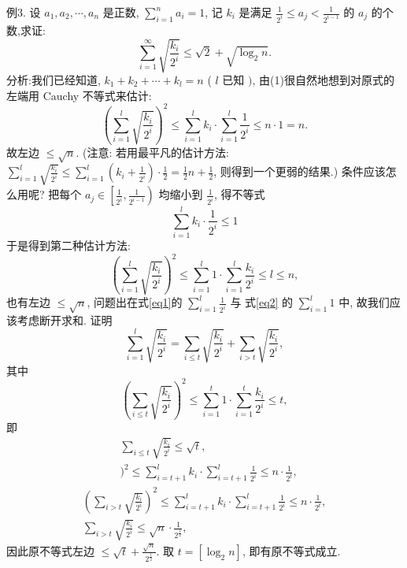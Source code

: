 例3. 设 $a_1, a_2, \cdots, a_n$ 是正数, $\sum_{i=1}^n a_i=1$, 记 $k_i$ 是满足 $\frac{1}{2^i} \leqslant a_j<\frac{1}{2^{i-1}}$ 的 $a_j$ 的个数,求证:
$$
\sum_{i=1}^{\infty} \sqrt{\frac{k_i}{2^i}} \leqslant \sqrt{2}+\sqrt{\log _2 n} .
$$
分析:我们已经知道, $k_1+k_2+\cdots+k_l=n$ ( $l$ 已知 $)$,
由(1)很自然地想到对原式的左端用 Cauchy 不等式来估计:
$$
\left(\sum_{i=1}^l \sqrt{\frac{k_i}{2^i}}\right)^2 \leqslant \sum_{i=1}^l k_i \cdot \sum_{i=1}^l \frac{1}{2^i} \leqslant n \cdot 1=n . \label{eq1}
$$
故左边 $\leqslant \sqrt{n}$.
(注意: 若用最平凡的估计方法: $\sum_{i=1}^l \sqrt{\frac{k_i}{2^i}} \leqslant \sum_{i=1}^l\left(k_i+\frac{1}{2^i}\right) \cdot \frac{1}{2}=\frac{1}{2} n+ \frac{1}{2}$, 则得到一个更弱的结果.)
条件应该怎么用呢?
把每个 $a_j \in\left[\frac{1}{2^i}, \frac{1}{2^{i-1}}\right)$ 均缩小到 $\frac{1}{2^i}$, 得不等式
$$
\sum_{i=1}^l k_i \cdot \frac{1}{2^i} \leqslant 1
$$
于是得到第二种估计方法:
$$
\left(\sum_{i=1}^l \sqrt{\frac{k_i}{2^i}}\right)^2 \leqslant \sum_{i=1}^l 1 \cdot \sum_{i=1}^l \frac{k_i}{2^i} \leqslant l \leqslant n, \label{eq2}
$$
也有左边 $\leqslant \sqrt{n}$, 问题出在式\ref{eq1}的 $\sum_{i=1}^l \frac{1}{2^i}$ 与 式\ref{eq2} 的 $\sum_{i=1}^l 1$ 中, 故我们应该考虑断开求和.
证明
$$
\sum_{i=1}^l \sqrt{\frac{k_i}{2^i}}=\sum_{i \leqslant t} \sqrt{\frac{k_i}{2^i}}+\sum_{i>t} \sqrt{\frac{k_i}{2^i}},
$$
其中
$$
\left(\sum_{i \leqslant t} \sqrt{\frac{k_i}{2^i}}\right)^2 \leqslant \sum_{i=1}^t 1 \cdot \sum_{i=1}^t \frac{k_i}{2^i} \leqslant t,
$$
即
$$
\begin{aligned}
& \sum_{i \leqslant t} \sqrt{\frac{k_i}{2^i}} \leqslant \sqrt{t}, \\
& )^2 \leqslant \sum_{i=t+1}^l k_i \cdot \sum_{i=t+1}^l \frac{1}{2^i} \leqslant n \cdot \frac{1}{2^t},
\end{aligned}
$$
$$
\begin{gathered}
\left(\sum_{i>t} \sqrt{\frac{k_i}{2^i}}\right)^2 \leqslant \sum_{i=t+1}^l k_i \cdot \sum_{i=t+1}^l \frac{1}{2^i} \leqslant n \cdot \frac{1}{2^t}, \\
\sum_{i>t} \sqrt{\frac{k_i}{2^i}} \leqslant \sqrt{n} \cdot \frac{1}{2^{\frac{t}{2}}},
\end{gathered}
$$
因此原不等式左边 $\leqslant \sqrt{t}+\frac{\sqrt{n}}{2^{\frac{t}{2}}}$.
取 $t=\left[\log _2 n\right]$, 即有原不等式成立.



